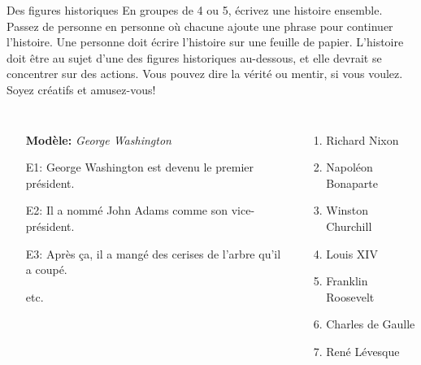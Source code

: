 \begin{frame}{Des figures historiques}
  En groupes de 4 ou 5, écrivez une histoire ensemble.
  Passez de personne en personne où chacune ajoute une phrase pour continuer l'histoire.
  Une personne doit écrire l'histoire sur une feuille de papier.
  L'histoire doit être au sujet d'une des figures historiques au-dessous, et elle devrait se concentrer sur des actions.
  Vous pouvez dire la vérité ou mentir, si vous voulez.
  Soyez créatifs et amusez-vous!
  \begin{columns}
      \begin{itemize}
        \item[] \textbf{Modèle:} \emph{George Washington}
        \item[E1:] George Washington est devenu le premier président.
        \item[E2:] Il a nommé John Adams comme son vice-président.
        \item[E3:] Après ça, il a mangé des cerises de l'arbre qu'il a coupé.
        \item[] etc.
      \end{itemize}
      \begin{enumerate}
        \item Richard Nixon
        \item Napoléon Bonaparte
        \item Winston Churchill
        \item Louis XIV
        \item Franklin Roosevelt
        \item Charles de Gaulle
        \item René Lévesque
      \end{enumerate}
  \end{columns}
\end{frame}